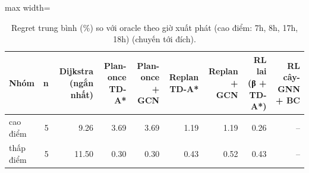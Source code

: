 \begin{table}[!htbp]
\centering
\small
\caption{Regret trung bình (\%) so với oracle theo giờ xuất phát (cao điểm: 7h, 8h, 17h, 18h) (chuyến tới đích).}
\label{tab:tab_by_peak}
\begin{adjustbox}{max width=\linewidth}
\begin{tabular}{lrrrrrrrr}
\toprule
Nhóm & n & Dijkstra (ngắn nhất) & Plan-once TD-A* & Plan-once + GCN & Replan TD-A* & Replan + GCN & RL lai (β + TD-A*) & RL cây-GNN + BC \\
\midrule
cao điểm & 5 & 9.26 & 3.69 & 3.69 & 1.19 & 1.19 & 0.26 & -- \\
thấp điểm & 5 & 11.50 & 0.30 & 0.30 & 0.43 & 0.52 & 0.43 & -- \\
\bottomrule
\end{tabular}
\end{adjustbox}
\end{table}
